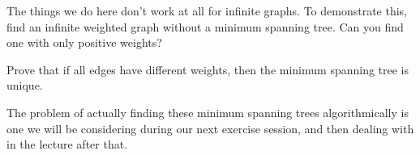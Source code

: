 \documentclass[nobib]{tufte-handout}
\begin{document}
\begin{xca}
    The things we do here don't work at all for infinite graphs. To demonstrate this, find an infinite weighted graph without a minimum spanning tree. Can you find one with only positive weights?
\end{xca}

\begin{xca}
    Prove that if all edges have different weights, then the minimum spanning tree is unique.
\end{xca}

The problem of actually finding these minimum spanning trees algorithmically is one we will be considering during our next exercise session, and then dealing with in the lecture after that.

%
%
\end{document}
